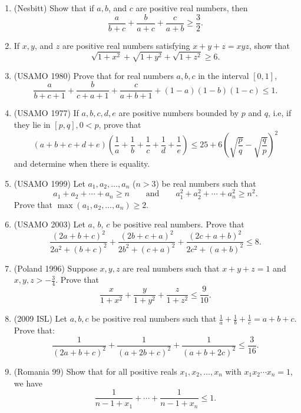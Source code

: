 \documentclass[11pt]{article}
\begin{document}
\begin{enumerate}
  \item (Nesbitt) Show that if $a,b$, and $c$ are positive real numbers, then \[ \frac{a}{b+c} + \frac{b}{a+c} + \frac{c}{a+b} \geq \frac{3}{2}. \]
  
  \item If $x,y$, and $z$ are positive real numbers satisfying $x + y + z = xyz$, show that \[ \sqrt{1+x^2} + \sqrt{1+y^2} + \sqrt{1+z^2} \geq 6. \]

  \item (USAMO 1980) Prove that for real numbers $a,b,c$ in the interval $[0,1]$, \[ \frac{a}{b+c+1}+\frac{b}{c+a+1}+\frac{c}{a+b+1}+(1-a)(1-b)(1-c) \le 1. \]
  
  \item (USAMO 1977) If $ a,b,c,d,e$ are positive numbers bounded by $ p$ and $ q$, i.e, if they lie in $ [p,q], 0 < p$, prove that
\[ (a + b + c + d + e)\left(\frac {1}{a} + \frac {1}{b} + \frac {1}{c} + \frac {1}{d} + \frac {1}{e}\right) \le 25 + 6\left(\sqrt {\frac {p}{q}} - \sqrt {\frac {q}{p}}\right)^2\]
and determine when there is equality.
 
  \item (USAMO 1999) Let $a_{1}, a_{2}, \dots, a_{n}$ ($n > 3$) be real numbers such that \[ a_{1} + a_{2} + \cdots + a_{n} \geq n \qquad \mbox{and} \qquad a_{1}^{2} + a_{2}^{2} + \cdots + a_{n}^{2} \geq n^{2}.  \] Prove that $\max(a_{1}, a_{2}, \dots, a_{n}) \geq 2$. 
  
  \item (USAMO 2003) Let $ a$, $ b$, $ c$ be positive real numbers. Prove that
\[ \dfrac{(2a + b + c)^2}{2a^2 + (b + c)^2} + \dfrac{(2b + c + a)^2}{2b^2 + (c + a)^2} + \dfrac{(2c + a + b)^2}{2c^2 + (a + b)^2} \le 8. \] 

  \item (Poland 1996) Suppose $x,y,z$ are real numbers such that $x + y + z = 1$ and $x,y,z > -\frac{3}{4}$. Prove that \[ \frac{x}{1+x^2} + \frac{y}{1+y^2} + \frac{z}{1+z^2} \leq \frac{9}{10}. \] 
  
  \item (2009 ISL) Let $a,b,c$ be positive real numbers such that $\frac{1}{a} + \frac{1}{b} + \frac{1}{c} = a + b + c$. Prove that: \[ \frac{1}{(2a+b+c)^2} + \frac{1}{(a+2b+c)^2} + \frac{1}{(a+b+2c)^2} \leq \frac{3}{16}. \] 
  
  \item (Romania 99) Show that for all positive reals $x_1, x_2, \ldots, x_n$ with $x_1 x_2 \cdots x_n = 1$, we have \[ \frac{1}{n-1 + x_1} + \cdots + \frac{1}{n - 1 + x_n} \leq 1. \]
 

\end{enumerate}
\end{document}
